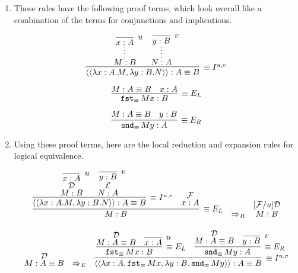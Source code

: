 \documentclass[11pt,letterpaper]{article}
\DeclareMathOperator{\fste}{\mathtt{fst}_\equiv}
\DeclareMathOperator{\snde}{\mathtt{snd}_\equiv}
\newcommand{\equivproofterm}[6]{
    \left \langle \left \langle
        \lambda #1 : #2 . #3,
        \lambda #4 : #5 . #6
    \right \rangle \right \rangle : #2 \equiv #5
}
\begin{document}
\begin{enumerate}
    \item These rules have the following proof terms, which look overall like a
        combination of the terms for conjunctions and implications.

        $$
        \infer[\equiv I^{u,v}]{\equivproofterm{x}{A}{M}{y}{B}{N}}{
            \infer*{M : B}{
                \infer[u]{x : A}{}
            }
            &
            \infer*{N : A}{
                \infer[v]{y : B}{}
            }
        }
        $$

        $$
        \infer[\equiv E_L]{\fste M x : B}{
            M : A \equiv B
            &
            x : A
        }
        $$

        $$
        \infer[\equiv E_R]{\snde M y : A}{
            M : A \equiv B
            &
            y : B
        }
        $$

    \item Using these proof terms, here are the local reduction and expansion
        rules for logical equivalence.

        $$
        \begin{array}{c c c}
            \infer[\equiv E_L]{M : B}{
                \infer[\equiv I^{u, v}]{\equivproofterm{x}{A}{M}{y}{B}{N}}{
                    \deduce[\mathcal{D}]{M:B}{
                        \infer[u]{x:A}{}
                    }
                    &
                    \deduce[\mathcal{E}]{N:A}{
                        \infer[v]{y:B}{}
                    }
                }
                &
                \deduce[\mathcal{F}]{x : A}{}
            }
            &
            \Rightarrow_R
            &
            \deduce[{[}\mathcal{F} / u{]} \mathcal{D}]{M:B}{}
        \end{array}
        $$

        $$
        \begin{array}{c c c}
            \deduce[\mathcal{D}]{M : A \equiv B}{}
            &
            \Rightarrow_E
            &
            \infer[\equiv I^{u, v}]{
                \equivproofterm{x}{A}{\fste M x}{y}{B}{\snde M y}
            }{
                \infer[\equiv E_L]{\fste M x : B}{
                    \deduce[\mathcal{D}]{M : A \equiv B}{}
                    &
                    \infer[u]{x : A}{}
                }
                &
                \infer[\equiv E_R]{\snde M y : A}{
                    \deduce[\mathcal{D}]{M : A \equiv B}{}
                    &
                    \infer[v]{y : B}{}
                }
            }
        \end{array}
        $$


\end{enumerate}
\end{document}
